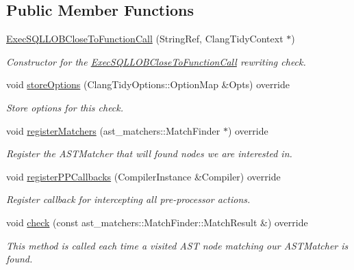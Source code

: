 \subsection*{Public Member Functions}
\begin{DoxyCompactItemize}
\item 
\hyperlink{classclang_1_1tidy_1_1pagesjaunes_1_1_exec_s_q_l_l_o_b_close_to_function_call_a107a219b92860af88d0f49b04401e5a9}{Exec\+S\+Q\+L\+L\+O\+B\+Close\+To\+Function\+Call} (String\+Ref, Clang\+Tidy\+Context $\ast$)
\begin{DoxyCompactList}\small\item\em Constructor for the \hyperlink{classclang_1_1tidy_1_1pagesjaunes_1_1_exec_s_q_l_l_o_b_close_to_function_call}{Exec\+S\+Q\+L\+L\+O\+B\+Close\+To\+Function\+Call} rewriting check. \end{DoxyCompactList}\item 
void \hyperlink{classclang_1_1tidy_1_1pagesjaunes_1_1_exec_s_q_l_l_o_b_close_to_function_call_a2a8af72b74ea427236ed0660f8b595ff}{store\+Options} (Clang\+Tidy\+Options\+::\+Option\+Map \&Opts) override
\begin{DoxyCompactList}\small\item\em Store options for this check. \end{DoxyCompactList}\item 
void \hyperlink{classclang_1_1tidy_1_1pagesjaunes_1_1_exec_s_q_l_l_o_b_close_to_function_call_adbb0c6d9eb3bd25698ccf9e6a73212cc}{register\+Matchers} (ast\+\_\+matchers\+::\+Match\+Finder $\ast$) override
\begin{DoxyCompactList}\small\item\em Register the A\+S\+T\+Matcher that will found nodes we are interested in. \end{DoxyCompactList}\item 
void \hyperlink{classclang_1_1tidy_1_1pagesjaunes_1_1_exec_s_q_l_l_o_b_close_to_function_call_a293550811c0d076f2ce34de80532c195}{register\+P\+P\+Callbacks} (Compiler\+Instance \&Compiler) override
\begin{DoxyCompactList}\small\item\em Register callback for intercepting all pre-\/processor actions. \end{DoxyCompactList}\item 
void \hyperlink{classclang_1_1tidy_1_1pagesjaunes_1_1_exec_s_q_l_l_o_b_close_to_function_call_a14cb29875129667687b1b4016d82399d}{check} (const ast\+\_\+matchers\+::\+Match\+Finder\+::\+Match\+Result \&) override
\begin{DoxyCompactList}\small\item\em This method is called each time a visited A\+ST node matching our A\+S\+T\+Matcher is found. \end{DoxyCompactList}\item 

\end{DoxyCompactItemize}
